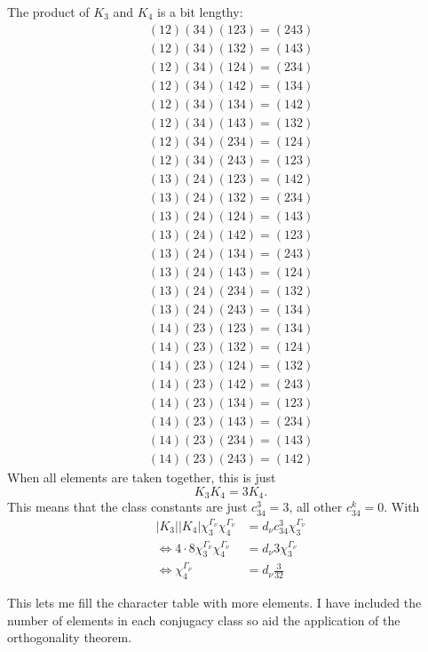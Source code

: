 \documentclass[11pt, english, fleqn, DIV=15, headinclude, BCOR=1cm]{scrartcl}
\begin{document}
The product of $K_3$ and $K_4$ is a bit lengthy:
\begin{gather*}
    (12)(34) (123) = (243) \\
    (12)(34) (132) = (143) \\
    (12)(34) (124) = (234) \\
    (12)(34) (142) = (134) \\
    (12)(34) (134) = (142) \\
    (12)(34) (143) = (132) \\
    (12)(34) (234) = (124) \\
    (12)(34) (243) = (123) \\
    (13)(24) (123) = (142) \\
    (13)(24) (132) = (234) \\
    (13)(24) (124) = (143) \\
    (13)(24) (142) = (123) \\
    (13)(24) (134) = (243) \\
    (13)(24) (143) = (124) \\
    (13)(24) (234) = (132) \\
    (13)(24) (243) = (134) \\
    (14)(23) (123) = (134) \\
    (14)(23) (132) = (124) \\
    (14)(23) (124) = (132) \\
    (14)(23) (142) = (243) \\
    (14)(23) (134) = (123) \\
    (14)(23) (143) = (234) \\
    (14)(23) (234) = (143) \\
    (14)(23) (243) = (142)
\end{gather*}
When all elements are taken together, this is just
\[
    K_3 K_4 = 3 K_4.
\]
This means that the class constants are just $c_{34}^3 = 3$, all other
$c_{34}^k = 0$. With
\begin{align*}
    |K_3| |K_4| \chi^{\Gamma_\nu}_3 \chi^{\Gamma_\nu}_4 &= d_\nu c_{34}^3
    \chi^{\Gamma_\nu}_3 \\
    \iff 4 \cdot 8 \chi^{\Gamma_\nu}_3 \chi^{\Gamma_\nu}_4 &= d_\nu 3 \chi^{\Gamma_\nu}_3 \\
    \iff \chi^{\Gamma_\nu}_4 &= d_\nu \frac{3}{32}
\end{align*}

This lets me fill the character table with more elements. I have included the
number of elements in each conjugacy class so aid the application of the
orthogonality theorem.
\end{document}
